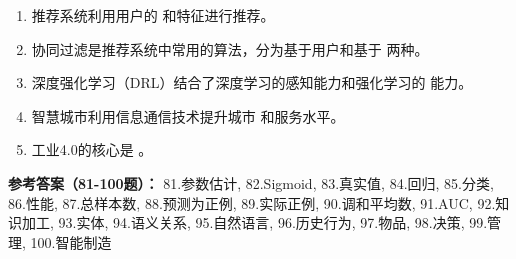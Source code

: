 \begin{enumerate}[resume,leftmargin=2em,itemsep=1pt]
\item 推荐系统利用用户的 \underline{\hspace{3em}} 和特征进行推荐。
\item 协同过滤是推荐系统中常用的算法，分为基于用户和基于 \underline{\hspace{3em}} 两种。
\item 深度强化学习（DRL）结合了深度学习的感知能力和强化学习的 \underline{\hspace{3em}} 能力。
\item 智慧城市利用信息通信技术提升城市 \underline{\hspace{3em}} 和服务水平。
\item 工业4.0的核心是 \underline{\hspace{3em}}。
\end{enumerate}

\textbf{参考答案（81-100题）：}
81.参数估计, 82.Sigmoid, 83.真实值, 84.回归, 85.分类, 86.性能, 87.总样本数, 88.预测为正例, 89.实际正例, 90.调和平均数, 
91.AUC, 92.知识加工, 93.实体, 94.语义关系, 95.自然语言, 96.历史行为, 97.物品, 98.决策, 99.管理, 100.智能制造

